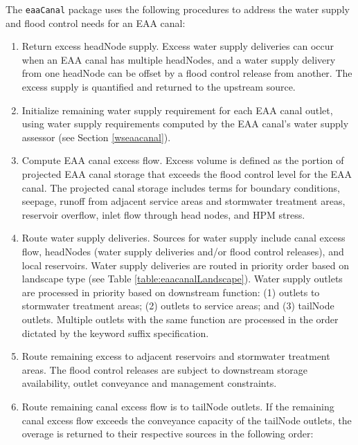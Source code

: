 The {\tt eaaCanal} package uses the following procedures to address
the water supply and flood control needs for an EAA canal:

\begin{enumerate}

 \item Return excess headNode supply.  Excess water supply deliveries
   can occur when an EAA canal has multiple headNodes, and a water
   supply delivery from one headNode can be offset by a flood control
   release from another.  The excess supply is quantified and returned
   to the upstream source.

 \item Initialize remaining water supply requirement for each EAA
   canal outlet, using water supply requirements computed by the EAA
   canal's water supply assessor (see Section \ref{wseaacanal}).

 \item Compute EAA canal excess flow.  Excess volume is defined as the
   portion of projected EAA canal storage that exceeds the flood
   control level for the EAA canal.  The projected canal storage
   includes terms for boundary conditions, seepage, runoff from
   adjacent service areas and stormwater treatment areas, reservoir
   overflow, inlet flow through head nodes, and HPM stress.

 \item Route water supply deliveries.  Sources for water supply
   include canal excess flow, headNodes (water supply deliveries
   and/or flood control releases), and local reservoirs.  Water supply
   deliveries are routed in priority order based on landscape type
   (see Table \ref{table:eaacanalLandscape}).  Water supply outlets
   are processed in priority based on downstream function: (1) outlets
   to stormwater treatment areas; (2) outlets to service areas; and
   (3) tailNode outlets.  Multiple outlets with the same function are
   processed in the order dictated by the keyword suffix
   specification.

 \item Route remaining excess to adjacent reservoirs and stormwater
   treatment areas.  The flood control releases are subject to
   downstream storage availability, outlet conveyance and management
   constraints.  

 \item Route remaining canal excess flow is to tailNode outlets. If
   the remaining canal excess flow exceeds the conveyance capacity of the
   tailNode outlets, the overage is returned to their respective
   sources in the following order: 


\end{enumerate}
